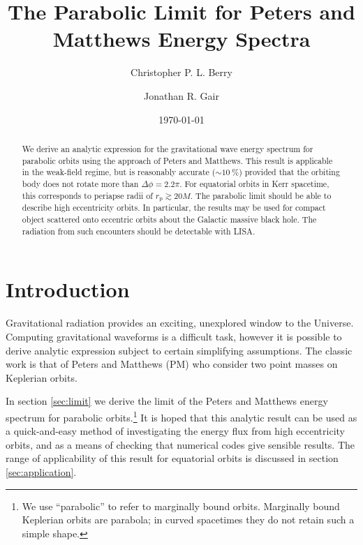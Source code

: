 \documentclass[aps,prd,reprint,showpacs,groupedaddress]{revtex4-1}
\newcommand{\secref}[1]{section \ref{sec:#1}}
\newcommand{\sub}[1]{\ensuremath{_\text{#1}}}
\begin{document}

\title{The Parabolic Limit for Peters and Matthews Energy Spectra}

\author{Christopher P. L. Berry}
\author{Jonathan R. Gair}

\date{\today}

\begin{abstract}
We derive an analytic expression for the gravitational wave energy spectrum for parabolic orbits using the approach of Peters and Matthews. This result is applicable in the weak-field regime, but is reasonably accurate ($\sim \SI{10}{\percent}$) provided that the orbiting body does not rotate more than $\Delta \phi = 2.2\pi$. For equatorial orbits in Kerr spacetime, this corresponds to periapse radii of $r\sub{p} \gtrsim 20 M$. The parabolic limit should be able to describe high eccentricity orbits. In particular, the results may be used for compact object scattered onto eccentric orbits about the Galactic massive black hole. The radiation from such encounters should be detectable with LISA.
\end{abstract}


\maketitle

\section{Introduction}

Gravitational radiation provides an exciting, unexplored window to the Universe. Computing gravitational waveforms is a difficult task, however it is possible to derive analytic expression subject to certain simplifying assumptions. The classic work is that of Peters and Matthews\cite{Peters1963, Peters1964} (PM) who consider two point masses on Keplerian orbits.

In \secref{limit} we derive the limit of the Peters and Matthews energy spectrum for parabolic orbits.\footnote{We use ``parabolic'' to refer to marginally bound orbits. Marginally bound Keplerian orbits are parabola; in curved spacetimes they do not retain such a simple shape.} It is hoped that this analytic result can be used as a quick-and-easy method of investigating the energy flux from high eccentricity orbits, and as a means of checking that numerical codes give sensible results. The range of applicability of this result for equatorial orbits is discussed in \secref{application}.
\end{document}
